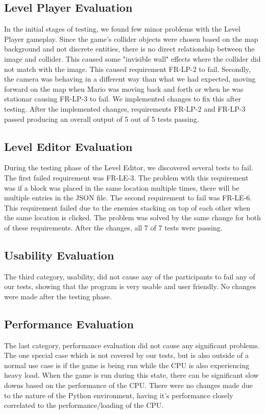 \documentclass[12pt, titlepage]{article}
\begin{document}
\subsection{Level Player Evaluation}

In the initial stages of testing, we found few minor problems with the Level Player gameplay. Since the game's collider objects were chosen based on the map background and not discrete entities, there is no direct relationship between the image and collider. This caused some "invisible wall" effects where the collider did not match with the image. This caused requirement FR-LP-2 to fail. Secondly, the camera was behaving in a different way than what we had expected, moving forward on the map when Mario was moving back and forth or when he was stationar causing FR-LP-3 to fail. We implemented changes to fix this after testing. After the implemented changes, requirements FR-LP-2 and FR-LP-3 passed producing an overall output of 5 out of 5 tests passing.

\subsection{Level Editor Evaluation}

During the testing phase of the Level Editor, we discovered several tests to fail. The first failed requirement was FR-LE-3. The problem with this requirement was if a block was placed in the same location multiple times, there will be multiple entries in the JSON file. The second requirement to fail was FR-LE-6. This requirement failed due to the enemies stacking on top of each other when the same location is clicked. The problem was solved by the same change for both of these requirements. After the changes, all 7 of 7 tests were passing.

\subsection{Usability Evaluation}

The third category, usability, did not cause any of the participants to fail any of our tests, showing that the program is very usable and user friendly. No changes were made after the testing phase.

\subsection{Performance Evaluation}

The last category, performance evaluation did not cause any significant problems. The one special case which is not covered by our tests, but is also outside of a normal use case is if the game is being run while the CPU is also experiencing heavy load. When the game is run during this state, there can be significant slow downs based on the performance of the CPU. There were no changes made due to the nature of the Python environment, having it's performance closely correlated to the performance/loading of the CPU.
\end{document}
